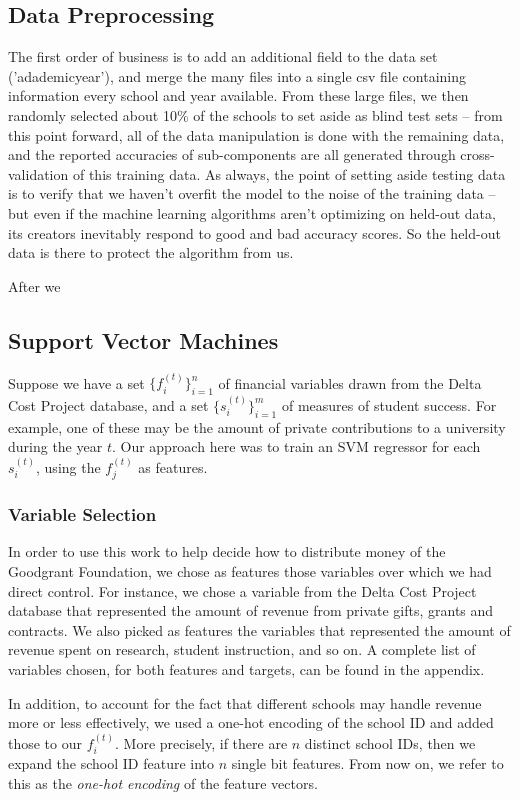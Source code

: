 \documentclass[paper.tex]{subfiles}
\begin{document}
\subsection{Data Preprocessing}
The first order of business is to add an additional field to the data set ('adademicyear'), and merge the many files into a single csv file containing information every school and year available. From these large files, we then randomly selected about 10\% of the schools to set aside as blind test sets -- from this point forward, all of the data manipulation is done with the remaining data, and the reported accuracies of sub-components are all generated through cross-validation of this training data. As always, the point of setting aside testing data is to verify that we haven't overfit the model to the noise of the training data -- but even if the machine learning algorithms aren't optimizing on held-out data, its creators inevitably respond to good and bad accuracy scores. So the held-out data is there to protect the algorithm from us. 

After we 

\subsection{Support Vector Machines} 
Suppose we have a set $\{ f_i^{(t)} \}_{i = 1}^n$ of financial variables drawn from the Delta Cost Project database, and a set $\{ s_i^{(t)} \}_{i = 1}^m$ of measures of student success. For example, one of these may be the amount of private contributions to a university during the year $t$. Our approach here was to train an SVM regressor for each $s_i^{(t)}$, using the $f_j^{(t)}$ as features. 
\subsubsection{Variable Selection} 
In order to use this work to help decide how to distribute money of the Goodgrant Foundation, we chose as features those variables over which we had direct control. For instance, we chose a variable from the Delta Cost Project database that represented the amount of revenue from private gifts, grants and contracts. We also picked as features the variables that represented the amount of revenue spent on research, student instruction, and so on. A complete list of variables chosen, for both features and targets, can be found in the appendix.  

In addition, to account for the fact that different schools may handle revenue more or less effectively, we used a one-hot encoding of the school ID and added those to our $f_i^{(t)}$. More precisely, if there are $n$ distinct school IDs, then we expand the school ID feature into $n$ single bit features. From now on, we refer to this as the \emph{one-hot encoding} of the feature vectors. 
\end{document}
